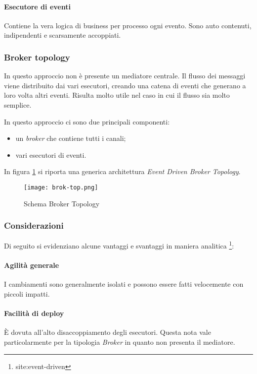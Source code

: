 \paragraph{Esecutore di eventi}
Contiene la vera logica di business per processo ogni evento. Sono auto contenuti, indipendenti e scarsamente accoppiati.



\subsubsection{Broker topology}
In questo approccio non è presente un mediatore centrale. Il flusso dei messaggi viene distribuito dai vari esecutori, creando una catena di eventi che generano a loro volta altri eventi. Risulta molto utile nel caso in cui il flusso sia molto semplice. 

In questo approccio ci sono due principali componenti:
\begin{itemize}
    \item un \emph{broker} che contiene tutti i canali;
    \item vari esecutori di eventi.
\end{itemize}
    
In figura \ref{fig:eventdriven-bro-top} si riporta una generica architettura \emph{Event Driven Broker Topology}.

\begin{figure}[htbp]
    \centering
    \texttt{[image: brok-top.png]} 
    \caption{Schema Broker Topology}
    \label{fig:eventdriven-bro-top} 
\end{figure}

\subsubsection{Considerazioni}
Di seguito si evidenziano alcune vantaggi e svantaggi in maniera analitica \footnote{site:event-driven}:
\paragraph{Agilità generale}
I cambiamenti sono generalmente isolati e possono essere fatti velocemente con piccoli impatti.
\paragraph{Facilità di deploy}
È dovuta all’alto disaccoppiamento degli esecutori. Questa nota vale particolarmente per la tipologia \emph{Broker} in quanto non presenta il mediatore.
